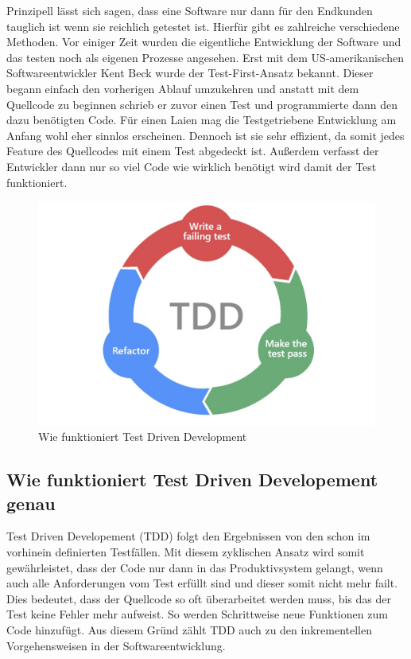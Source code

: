 Prinzipell lässt sich sagen, dass eine Software nur dann für den Endkunden tauglich ist wenn sie reichlich getestet ist. Hierfür gibt es zahlreiche verschiedene Methoden. Vor einiger Zeit wurden die eigentliche Entwicklung der Software und das testen noch als eigenen Prozesse angesehen. Erst mit dem US-amerikanischen Softwareentwickler Kent Beck wurde der Test-First-Ansatz bekannt. Dieser begann einfach den vorherigen Ablauf umzukehren und anstatt mit dem Quellcode zu beginnen schrieb er zuvor einen Test und programmierte dann den dazu benötigten Code. Für einen Laien mag die Testgetriebene Entwicklung am Anfang wohl eher sinnlos erscheinen. Dennoch ist sie sehr effizient, da somit jedes Feature des Quellcodes mit einem Test abgedeckt ist. Außerdem verfasst der Entwickler dann nur so viel Code wie wirklich benötigt wird damit der Test funktioniert.

\begin{figure}
    \centering
    \includegraphics[width=0.5\linewidth]{pics/tdd.jpeg}
    \caption{Wie funktioniert Test Driven Development}
    \label{fig:enter-label}
\end{figure}

\subsection{Wie funktioniert Test Driven Developement genau}

Test Driven Developement (TDD) folgt den Ergebnissen von den schon im vorhinein definierten Testfällen. Mit diesem zyklischen Ansatz wird somit gewährleistet, dass der Code nur dann in das Produktivsystem gelangt, wenn auch alle Anforderungen vom Test erfüllt sind und dieser somit nicht mehr failt. Dies bedeutet, dass der Quellcode so oft überarbeitet werden muss, bis das der Test keine Fehler mehr aufweist. So werden Schrittweise neue Funktionen zum Code hinzufügt. Aus diesem Gründ zählt TDD auch zu den inkrementellen Vorgehensweisen in der Softwareentwicklung.

\cite{Was_ist_TDD}

